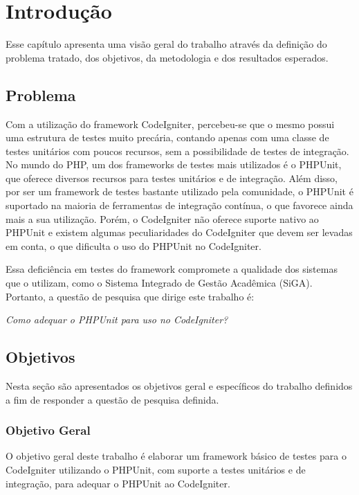\chapter[Introdução]{Introdução}

Esse capítulo apresenta uma visão geral do trabalho através da definição do problema tratado, dos objetivos, 
da metodologia e dos resultados esperados.

\section{Problema}

Com a utilização do framework CodeIgniter, percebeu-se que o mesmo possui uma estrutura de testes muito precária, contando
apenas com uma classe de testes unitários com poucos recursos, sem a possibilidade de testes de integração. No mundo do PHP,
um dos frameworks de testes mais utilizados é o PHPUnit, que oferece diversos recursos para testes unitários e de integração.
Além disso, por ser um framework de testes bastante utilizado pela comunidade, o PHPUnit é suportado na maioria de ferramentas
de integração contínua, o que favorece ainda mais a sua utilização. Porém, o CodeIgniter não oferece suporte nativo ao PHPUnit
e existem algumas peculiaridades do CodeIgniter que devem ser levadas em conta, o que dificulta o uso do PHPUnit no CodeIgniter.

Essa deficiência em testes do framework compromete a qualidade dos sistemas que o utilizam,
como o Sistema Integrado de Gestão Acadêmica (SiGA). Portanto, a questão de pesquisa que dirige este trabalho é:

\textit{Como adequar o PHPUnit para uso no CodeIgniter?}
  
\section{Objetivos}

  Nesta seção são apresentados os objetivos geral e específicos do trabalho definidos a fim de responder a
  questão de pesquisa definida.

\subsection{Objetivo Geral}

O objetivo geral deste trabalho é elaborar um framework básico de testes para o CodeIgniter utilizando o PHPUnit, com suporte a 
testes unitários e de integração, para adequar o PHPUnit ao CodeIgniter.

